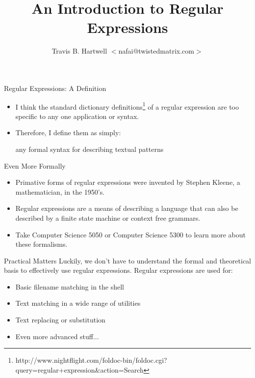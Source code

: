 \documentclass[ps,colorBG,contemporain]{prosper}
\title{An Introduction to Regular Expressions}
\begin{document}
\author{Travis B. Hartwell $<$nafai@twistedmatrix.com$>$}\begin{slide}{Regular Expressions: A Definition}\begin{itemize}
\item I think the standard dictionary definitions\footnote{http://www.nightflight.com/foldoc-bin/foldoc.cgi?query=regular+expression\&action=Search} of a regular expression are too specific to any one application or syntax.
\item Therefore, I define them as simply: \begin{em}any formal syntax for   describing textual patterns\end{em}
\end{itemize}
\end{slide}

\begin{slide}{Even More Formally}\begin{itemize}
\item Primative forms of regular expressions were invented by Stephen   Kleene, a mathematician, in the 1950's.
\item Regular expressions are a means of describing a language that     can also be described by a finite state machine or context free     grammars.
\item Take Computer Science 5050 or Computer Science 5300 to learn more     about these formalisms.
\end{itemize}
\end{slide}

\begin{slide}{Practical Matters}  Luckily, we don't have to understand the formal and theoretical basis to effectively use regular expressions.  Regular expressions are used for:  \begin{itemize}
\item Basic filename matching in the shell
\item Text matching in a wide range of utilities
\item Text replacing or substitution
\item Even more advanced stuff...
\end{itemize}
\end{slide}
\end{document}

